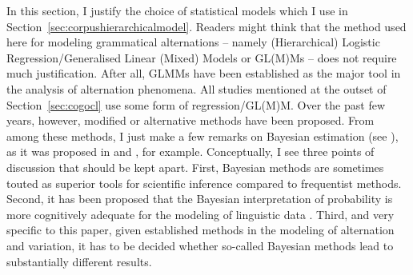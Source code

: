 \documentclass[USenglish]{article}
\begin{document}
In this section, I justify the choice of statistical models which I use in Section~\ref{sec:corpushierarchicalmodel}.
Readers might think that the method used here for modeling grammatical alternations -- namely (Hierarchical) Logistic Regression\slash Generalised Linear (Mixed) Models or GL(M)Ms -- does not require much justification.
After all, GLMMs have been established as the major tool in the analysis of alternation phenomena.
All studies mentioned at the outset of Section~\ref{sec:cogocl} use some form of regression\slash GL(M)M.
Over the past few years, however, modified or alternative methods have been proposed.
From among these methods, I just make a few remarks on Bayesian estimation (see \citealp{GelmanEa2014}), as it was proposed in \cite{Levshina2016} and \cite{Divjak2016a}, for example.
Conceptually, I see three points of discussion that should be kept apart.
First, Bayesian methods are sometimes touted as superior tools for scientific inference compared to frequentist methods.
Second, it has been proposed that the Bayesian interpretation of probability is more cognitively adequate for the modeling of linguistic data \cite[301--302]{Divjak2016a}.
Third, and very specific to this paper, given established methods in the modeling of alternation and variation, it has to be decided whether so-called Bayesian methods lead to substantially different results.
\end{document}
